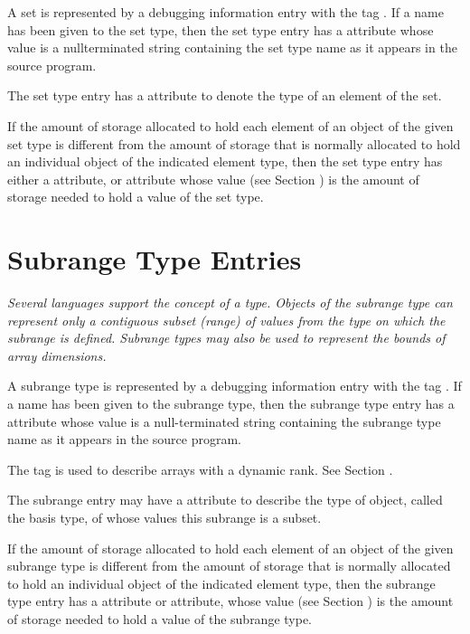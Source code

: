 A set is represented by a debugging information entry with
the tag \DWTAGsettypeTARG. 
If a name has been given to the
set type, then the set type entry has 
a \DWATname{} attribute
whose value is a null\dash terminated string containing the
set type name as it appears in the source program.

The set type entry has 
a \DWATtype{} attribute to denote the
type of an element of the set.

If the amount of storage allocated to hold each element of an
object of the given set type is different from the amount of
storage that is normally allocated to hold an individual object
of the indicated element type, then the set type entry has
either a \DWATbytesize{} attribute, or 
\DWATbitsize{} attribute
whose value (see Section ) is
the amount of storage needed to hold a value of the set type.

\section{Subrange Type Entries}
\label{chap:subrangetypeentries}

\textit{Several languages support the concept of a 
type. Objects of the subrange type can represent only a contiguous 
subset (range) of values from the type on which the subrange is defined.
Subrange types may also be used to represent the bounds of array dimensions.}

A subrange type is represented by a debugging information
entry with the tag 
\DWTAGsubrangetypeTARG. 
If a name has been given to the subrange type, then the 
subrange type entry has a 
\DWATname{} attribute
whose value is a null-terminated
string containing the subrange type name as it appears in
the source program.

The tag \DWTAGgenericsubrange{}
is used to describe arrays with a dynamic rank. See Section
.

The subrange entry may have a 
\DWATtype{} attribute to describe
the type of object, called the basis type, of whose values
this subrange is a subset.

If the amount of storage allocated to hold each element of an
object of the given subrange type is different from the amount
of storage that is normally allocated to hold an individual
object of the indicated element type, then the subrange
type entry has a 
\DWATbytesize{} attribute or 
\DWATbitsize{}
attribute, whose value 
(see Section )
is the amount of storage needed to hold a value of the subrange type.

